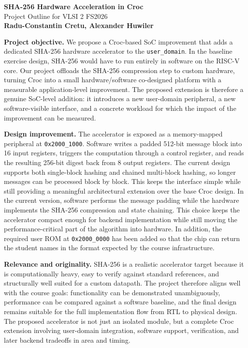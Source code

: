 \documentclass[10pt,a4paper]{article}
\begin{document}
\begin{center}
{\LARGE \textbf{SHA-256 Hardware Acceleration in Croc}}\\[2pt]
{\large Project Outline for VLSI 2 FS2026}\\[2pt]
\textbf{Radu-Constantin Cretu, Alexander Huwiler}
\end{center}

\vspace{0.15em}
\small
\textbf{Project objective.}
We propose a Croc-based SoC improvement that adds a dedicated SHA-256 hardware
accelerator to the \texttt{user\_domain}. In the baseline exercise design,
SHA-256 would have to run entirely in software on the RISC-V core. Our project
offloads the SHA-256 compression step to custom hardware, turning Croc into a
small hardware/software co-designed platform with a measurable application-level
improvement. The proposed extension is therefore a genuine SoC-level addition:
it introduces a new user-domain peripheral, a new software-visible interface,
and a concrete workload for which the impact of the improvement can be measured.

\textbf{Design improvement.}
The accelerator is exposed as a memory-mapped peripheral at
\texttt{0x2000\_1000}. Software writes a padded 512-bit message block into 16
input registers, triggers the computation through a control register, and reads
the resulting 256-bit digest back from 8 output registers. The current design
supports both single-block hashing and chained multi-block hashing, so longer
messages can be processed block by block. This keeps the interface simple while
still providing a meaningful architectural extension over the base Croc design.
In the current version, software performs the message padding while the hardware
implements the SHA-256 compression and state chaining. This choice keeps the
accelerator compact enough for backend implementation while still moving the
performance-critical part of the algorithm into hardware. In addition, the
required user ROM at \texttt{0x2000\_0000} has been added so that the chip can
return the student names in the format expected by the course infrastructure.

\textbf{Relevance and originality.}
SHA-256 is a realistic accelerator target because it is computationally heavy,
easy to verify against standard references, and structurally well suited for a
custom datapath. The project therefore aligns well with the course goals:
functionality can be demonstrated unambiguously, performance can be compared
against a software baseline, and the final design remains suitable for the full
implementation flow from RTL to physical design. The proposed accelerator is not
just an isolated module, but a complete Croc extension involving user-domain
integration, software support, verification, and later backend tradeoffs in area
and timing.
\end{document}
